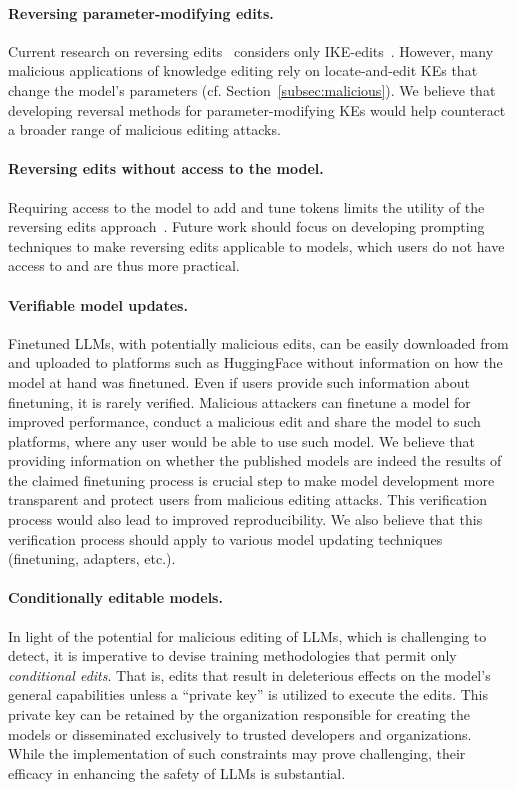 \paragraph{Reversing parameter-modifying edits.} 
Current research on reversing edits~\cite{youssef-etal-2024-reverse} considers only IKE-edits~\cite{zheng-etal-2023-edit}. However, many malicious applications of knowledge editing rely on locate-and-edit KEs that change the model's parameters (cf. Section~\ref{subsec:malicious}). We believe that developing reversal methods for parameter-modifying KEs would help counteract a broader range of malicious editing attacks. 

\paragraph{Reversing edits without access to the model.}
\label{subsubsec:reverse_no_model_access}
Requiring access to the model to add and tune tokens limits the utility of the reversing edits approach~\cite{youssef-etal-2024-reverse}. Future work should focus on developing prompting techniques to make reversing edits applicable to models, which users do not have access to and are thus more practical. 


\paragraph{Verifiable model updates.} 
Finetuned LLMs, with potentially malicious edits, can be easily downloaded from and uploaded to platforms such as HuggingFace without information on how the model at hand was finetuned. Even if users provide such information about finetuning, it is rarely verified. Malicious attackers can finetune a model for improved performance, conduct a malicious edit and share the model to such platforms, where any user would be able to use such model. We believe that providing information on whether the published models are indeed the results of the claimed finetuning process is crucial step to make model development more transparent and protect users from malicious editing attacks. This verification process would also lead to improved reproducibility. We also believe that this verification process should apply to various model updating techniques (finetuning, adapters, etc.).%

\paragraph{Conditionally editable models.} 
In light of the potential for malicious editing of LLMs, which is challenging to detect, it is imperative to devise training methodologies that permit only \emph{conditional edits}. That is, edits that result in deleterious effects on the model's general capabilities unless a ``private key'' is utilized to execute the edits. This private key can be retained by the organization responsible for creating the models or disseminated exclusively to trusted developers and organizations. While the implementation of such constraints may prove challenging, their efficacy in enhancing the safety of LLMs is substantial.



